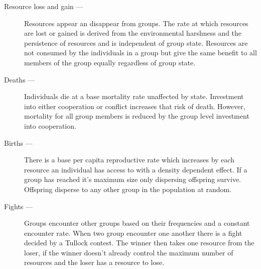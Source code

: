 \begin{description}
    \item[Resource loss and gain ---] Resources appear an disappear from groups. The rate at which resources are lost or gained is derived from the environmental harshness and the persistence of resources and is independent of group state. Resources are not consumed by the individuals in a group but give the same benefit to all members of the group equally regardless of group state.  
    \item[Deaths ---] Individuals die at a base mortality rate unaffected by state. Investment into either cooperation or conflict increases that risk of death. However, mortality for all group members is reduced by the group level investment into cooperation. 
    \item[Births ---] There is a base per capita reproductive rate which increases by each resource an individual has access to with a density dependent effect. If a group has reached it's maximum size only dispersing offspring survive. Offspring disperse to any other group in the population at random. 
    \item[Fights ---] Groups encounter other groups based on their frequencies and a constant encounter rate. When two group encounter one another there is a fight decided by a Tullock contest. The winner then takes one resource from the loser, if the winner doesn't already control the maximum number of resources and the loser has a resource to lose.  
\end{description}


 


